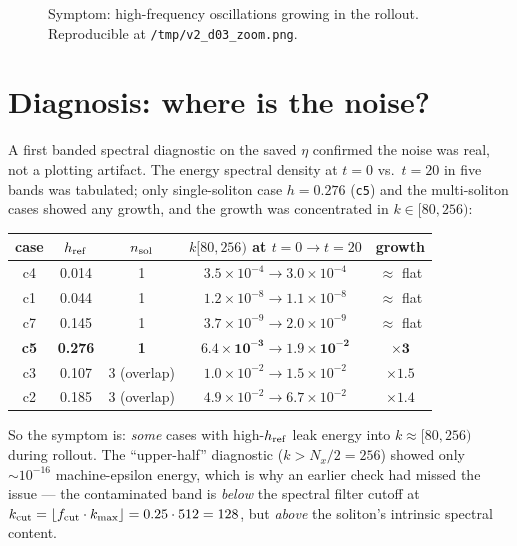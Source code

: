 \documentclass[11pt]{article}
\begin{document}
\begin{figure}[h]
  \centering
  \caption{Symptom: high-frequency oscillations growing in the rollout.
  Reproducible at \texttt{/tmp/v2\_d03\_zoom.png}.}
  \label{fig:before}
\end{figure}

\section{Diagnosis: where is the noise?}

A first banded spectral diagnostic on the saved $\eta$ confirmed the noise was
real, not a plotting artifact. The energy spectral density at $t{=}0$ vs.\ $t{=}20$
in five bands was tabulated; only single-soliton case $h{=}0.276$ (\texttt{c5})
and the multi-soliton cases showed any growth, and the growth was concentrated
in $k \in [80, 256)$:

\begin{center}
\begin{tabular}{cc cc c}
\toprule
case & $h_{\rm ref}$ & $n_{\rm sol}$ & $k[80,256)$ at $t{=}0 \to t{=}20$ & growth \\
\midrule
c4 & 0.014 & 1 & $3.5\times 10^{-4} \to 3.0\times 10^{-4}$ & $\approx$ flat \\
c1 & 0.044 & 1 & $1.2\times 10^{-8} \to 1.1\times 10^{-8}$ & $\approx$ flat \\
c7 & 0.145 & 1 & $3.7\times 10^{-9} \to 2.0\times 10^{-9}$ & $\approx$ flat \\
\textbf{c5} & \textbf{0.276} & \textbf{1} & $\mathbf{6.4\times 10^{-3} \to 1.9\times 10^{-2}}$ & $\mathbf{\times 3}$ \\
c3 & 0.107 & 3 (overlap) & $1.0\times 10^{-2} \to 1.5\times 10^{-2}$ & $\times 1.5$ \\
c2 & 0.185 & 3 (overlap) & $4.9\times 10^{-2} \to 6.7\times 10^{-2}$ & $\times 1.4$ \\
\bottomrule
\end{tabular}
\end{center}

So the symptom is: \emph{some} cases with high-$h_{\rm ref}$ leak energy into
$k \approx [80, 256)$ during rollout. The ``upper-half'' diagnostic
($k > N_x/2 = 256$) showed only $\sim 10^{-16}$ machine-epsilon energy, which
is why an earlier check had missed the issue --- the contaminated band is
\emph{below} the spectral filter cutoff at $k_{\rm cut} = \lfloor f_{\rm cut} \cdot k_{\max}
\rfloor = 0.25 \cdot 512 = 128$, but \emph{above} the soliton's
intrinsic spectral content.
\end{document}
